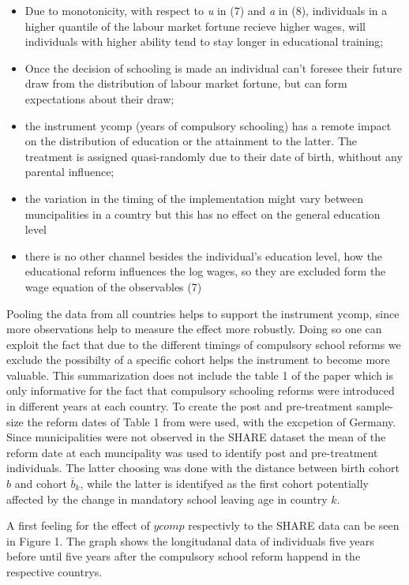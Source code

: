 \documentclass[12pt,a4paper]{article}
\begin{document}
\begin{itemize}
\item Due to monotonicity, with respect to \textit{u} in (7) and \textit{a} in (8), individuals in a higher quantile of the labour market fortune recieve higher wages, will individuals with higher ability tend to stay longer in educational training;
\item Once the decision of schooling is made an individual can't foresee their future draw from the distribution of labour market fortune, but can form expectations about their draw;
\item the instrument ycomp (years of compulsory schooling) has a remote impact on the distribution of education or the attainment to the latter. The treatment is assigned quasi-randomly due to their date of birth, whithout any parental influence;
\item the variation in the timing of the implementation might vary between muncipalities in a country but this has no effect on the general education level
\item there is no other channel besides the individual's education level, how the educational reform influences the log wages, so they are excluded form the wage equation of the observables (7)
\end{itemize}

Pooling the data from all countries helps to support the instrument
ycomp, since more observations help to measure the effect more robustly.
Doing so one can exploit the fact that due to the different timings of
compulsory school reforms we exclude the possibilty of a specific cohort
helps the instrument to become more valuable. This summarization does
not include the table 1 of the paper which is only informative for the
fact that compulsory schooling reforms were introduced in different
years at each country. To create the post and pre-treatment sample-size
the reform dates of Table 1 from \textcite{brunello} were used, with the
excpetion of Germany. Since municipalities were not observed in the
SHARE dataset the mean of the reform date at each muncipality was used
to identify post and pre-treatment individuals. The latter choosing was
done with the distance between birth cohort \(b\) and cohort
\(\overline{b}_k\), while the latter is identifyed as the first cohort
potentially affected by the change in mandatory school leaving age in
country \(k\).

A first feeling for the effect of \(ycomp\) respectivly to the SHARE
data can be seen in Figure 1. The graph shows the longitudanal data of
individuals five years before until five years after the compulsory
school reform happend in the respective countrys.
\end{document}
